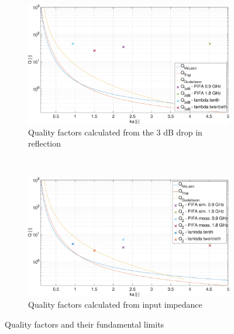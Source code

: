 \documentclass[11pt,a4paper]{article}
\begin{document}
            \begin{figure}[!ht]
                \centering
                \begin{subfigure}{.75\textwidth}
                    \centering
                    \includegraphics[width=\textwidth]{src/quality-factor-limits-q3db.eps}
                    \caption{\label{fig:quality-factor-limits-q3db}Quality factors calculated from the 3 dB drop in reflection}
                \end{subfigure}
                \\
                \centering
                \begin{subfigure}{.75\textwidth}
                    \centering
                    \includegraphics[width=\textwidth]{src/quality-factor-limits-qz.eps}
                    \caption{\label{fig:quality-factor-limits-qz}Quality factors calculated from input impedance}
                \end{subfigure}
                \caption{\label{fig:quality-factor-limits}Quality factors and their fundamental limits}
            \end{figure}
\end{document}
